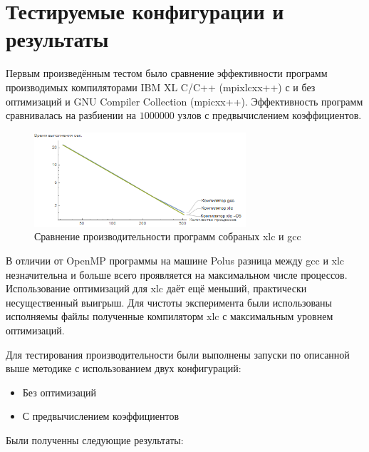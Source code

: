 \documentclass[a4paper,12pt,titlepage,finall]{article}
\begin{document}
\section{Тестируемые конфигурации и результаты}
Первым произведённым тестом было сравнение эффективности программ производимых компиляторами IBM XL C/C++ (mpixlcxx++) с и без оптимизаций и GNU Compiler Collection (mpicxx++). Эффективность программ сравнивалась на разбиении на $1 000 000$ узлов с предвычислением коэффициентов.
\begin{figure}[h]
\centering
\includegraphics[width=0.7\textwidth]{plot_compilers.png}
\caption{Сравнение производительности программ собраных xlc и gcc}
\end{figure}
\par
В отличии от OpenMP программы на машине Polus разница между gcc и xlc незначительна и больше всего проявляется на максимальном числе процессов. Использование оптимизаций для xlc даёт ещё меньший, практически несущественный выигрыш. Для чистоты эксперимента были использованы исполняемы файлы полученные компиляторм xlc с максимальным уровнем оптимизаций.
\par
Для тестирования производительности были выполнены запуски по описанной выше методике с использованием двух конфигураций:
\begin{itemize}
\item Без оптимизаций
\item С предвычислением коэффициентов
\end{itemize}
\par
Были полученны следующие результаты:
\end{document}
